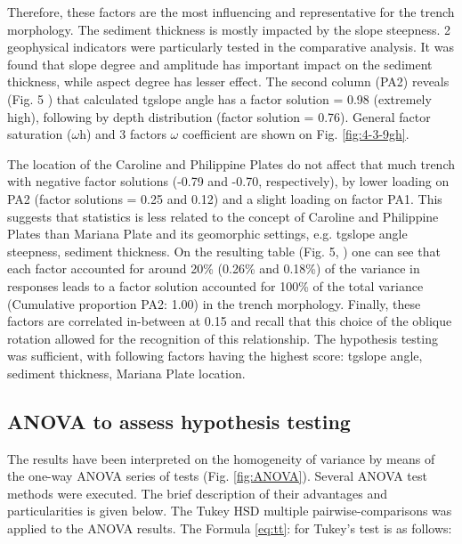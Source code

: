 \documentclass[11pt,a4paper]{report}
\begin{document}
{Therefore, these factors are the most influencing and representative for the trench morphology. The sediment thickness is mostly impacted by the slope steepness. 2 geophysical indicators were particularly tested in the comparative analysis. It was found that slope degree and amplitude has important impact on the sediment thickness, while aspect degree has lesser effect. The second column (PA2) reveals (Fig. 5 \cite{Lemenkova201866}) that calculated tg\degree\space slope angle has a factor solution = 0.98 (extremely high), following by depth distribution (factor solution = 0.76). General factor saturation ($\omega$h) and 3 factors $\omega$ coefficient are shown on Fig. \ref{fig:4-3-9gh}. 

The location of the Caroline and Philippine Plates do not affect that much trench with negative factor solutions (-0.79 and -0.70, respectively), by lower loading on PA2 (factor solutions = 0.25 and 0.12) and a slight loading on factor PA1. This suggests that statistics is less related to the concept of Caroline and Philippine Plates than Mariana Plate and its geomorphic settings, e.g.  tg\degree\space slope angle steepness, sediment thickness. On the resulting table (Fig. 5, \cite{Lemenkova201866}) one can see that each factor accounted for around 20\% (0.26\% and 0.18\%) of the variance in responses leads to a factor solution accounted for 100\% of the total variance (Cumulative proportion PA2: 1.00) in the trench morphology. Finally, these factors are correlated in-between at 0.15 and recall that this choice of the oblique rotation allowed for the recognition of this relationship. The hypothesis testing was sufficient, with following factors having the highest score: tg\degree\space slope angle, sediment thickness, Mariana Plate location.

\subsection{\ac{ANOVA} to assess hypothesis testing}\label{ssec:ANO}
The results have been interpreted on the homogeneity of variance by means of the one-way \ac{ANOVA} series of tests (Fig. \ref{fig:ANOVA}). Several \ac{ANOVA} test methods were executed. The brief description of their advantages and particularities is given below. The Tukey \ac{HSD} multiple pairwise-comparisons was applied to the \ac{ANOVA} results. The Formula \ref{eq:tt}: for Tukey's test is as follows: 

}
\end{document}
